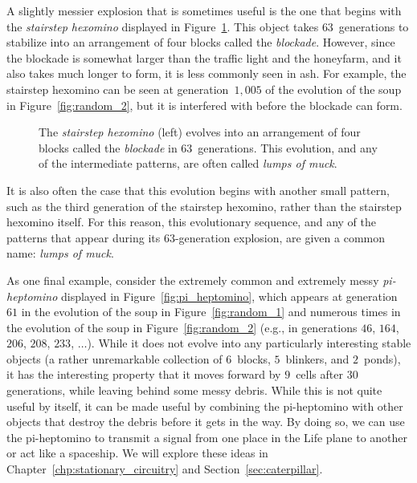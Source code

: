 A slightly messier explosion that is sometimes useful is the one that begins with the \emph{stairstep hexomino} displayed in Figure~\ref{fig:stairstep_hexomino}. This object takes $63$~generations to stabilize into an arrangement of four blocks called the \emph{blockade}. However, since the blockade is somewhat larger than the traffic light and the honeyfarm, and it also takes much longer to form, it is less commonly seen in ash. For example, the stairstep hexomino can be seen at generation~$1,005$ of the evolution of the soup in Figure~\ref{fig:random_2}, but it is interfered with before the blockade can form.

\begin{figure}[!htb]
	\centering
	\caption{The \emph{stairstep hexomino} (left) evolves into an arrangement of four blocks called the \emph{blockade} in $63$~generations. This evolution, and any of the intermediate patterns, are often called \emph{lumps of muck}.}\label{fig:stairstep_hexomino}
\end{figure}

It is also often the case that this evolution begins with another small pattern, such as the third generation of the stairstep hexomino, rather than the stairstep hexomino itself. For this reason, this evolutionary sequence, and any of the patterns that appear during its $63$-generation explosion, are given a common name: \emph{lumps of muck}.

As one final example, consider the extremely common and extremely messy \emph{pi-heptomino} displayed in Figure~\ref{fig:pi_heptomino}, which appears at generation~$61$ in the evolution of the soup in Figure~\ref{fig:random_1} and numerous times in the evolution of the soup in Figure~\ref{fig:random_2} (e.g., in generations $46$, $164$, $206$, $208$, $233$, $\ldots$). While it does not evolve into any particularly interesting stable objects (a rather unremarkable collection of $6$~blocks, $5$~blinkers, and $2$~ponds), it has the interesting property that it moves forward by $9$~cells after $30$ generations, while leaving behind some messy debris. While this is not quite useful by itself, it can be made useful by combining the pi-heptomino with other objects that destroy the debris before it gets in the way. By doing so, we can use the pi-heptomino to transmit a signal from one place in the Life plane to another or act like a spaceship. We will explore these ideas in Chapter~\ref{chp:stationary_circuitry} and Section~\ref{sec:caterpillar}.

